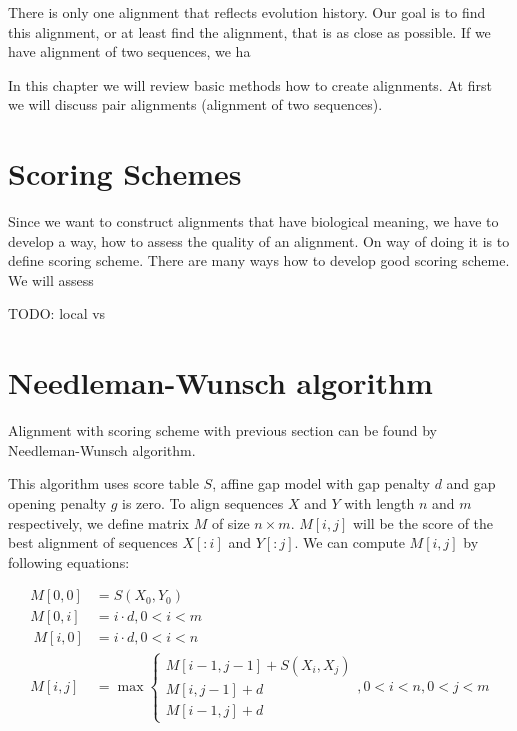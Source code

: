 There is only one alignment that reflects evolution history. Our goal is to find
this alignment, or at least find the alignment, that is as close as possible.
If we have alignment of two sequences, we ha

In this chapter we will review basic methods how to create alignments. At first
we will discuss pair alignments (alignment of two sequences). 



\section{Scoring Schemes}

Since we want to construct alignments that have biological meaning, we have to
develop a way, how to assess the quality of an alignment. On way of doing it is
to define scoring scheme. There are many ways how to develop good scoring
scheme. We will assess 

TODO: local vs 

\section{Needleman-Wunsch algorithm}

Alignment with scoring scheme with previous section can be found by
Needleman-Wunsch algorithm. 

This algorithm uses score table $S$, affine gap model with gap penalty $d$ and
gap opening penalty $g$ is zero. To align sequences $X$ and $Y$ with length $n$
and $m$ respectively, we define matrix $M$ of size $n\times m$. $M[i,j]$ will be
the score of the best alignment of sequences $X[:i]$ and $Y[:j]$. We can compute
$M[i,j]$ by following equations:

\begin{align}
M[0,0] &= S(X_0,Y_0)\\
M[0,i] &= i\cdot d, 0< i < m\\\
M[i,0] &= i\cdot d, 0< i < n\\
M[i,j] &= \max
\begin{cases}
 M[i-1,j-1]+S(X_i,X_j)\\M[i,j-1]+d\\
 M[i-1,j]+d
\end{cases}, 0<i<n,0<j<m \label{ALIGN:ALGO:AFFINE}
\end{align}

